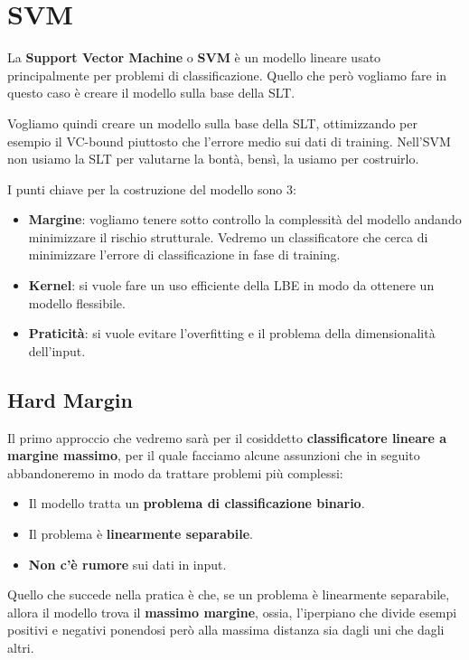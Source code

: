 \chapter{SVM}
La \textbf{Support Vector Machine} o \textbf{SVM} \`e un modello lineare usato principalmente per problemi di
classificazione. Quello che per\`o vogliamo fare in questo caso \`e creare il modello sulla base della SLT.

Vogliamo quindi creare un modello sulla base della SLT, ottimizzando per esempio il VC-bound piuttosto che l'errore medio
sui dati di training. Nell'SVM non usiamo la SLT per valutarne la bont\`a, bens\`i, la usiamo per costruirlo.

I punti chiave per la costruzione del modello sono 3:
\begin{itemize}
	\item \textbf{Margine}: vogliamo tenere sotto controllo la complessit\`a del modello andando minimizzare il rischio
	      strutturale. Vedremo un classificatore che cerca di minimizzare l'errore di classificazione in fase di training.
	\item \textbf{Kernel}: si vuole fare un uso efficiente della LBE in modo da ottenere un modello flessibile.
	\item \textbf{Praticit\`a}: si vuole evitare l'overfitting e il problema della dimensionalit\`a dell'input.
\end{itemize}

\section{Hard Margin}
Il primo approccio che vedremo sar\`a per il cosiddetto \textbf{classificatore lineare a margine massimo}, per il quale
facciamo alcune assunzioni che in seguito abbandoneremo in modo da trattare problemi pi\`u complessi:
\begin{itemize}
	\item Il modello tratta un \textbf{problema di classificazione binario}.
	\item Il problema \`e \textbf{linearmente separabile}.
	\item \textbf{Non c'\`e rumore} sui dati in input.
\end{itemize}
Quello che succede nella pratica \`e che, se un problema \`e linearmente separabile, allora il modello trova il
\textbf{massimo margine}, ossia, l'iperpiano che divide esempi positivi e negativi ponendosi per\`o alla massima distanza
sia dagli uni che dagli altri.

